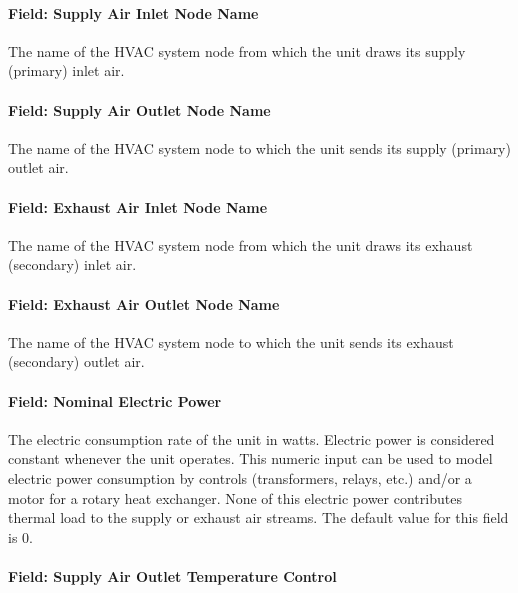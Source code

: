 \paragraph{Field: Supply Air Inlet Node Name}\label{field-supply-air-inlet-node-name-1-000}

The name of the HVAC system node from which the unit draws its supply (primary) inlet air.

\paragraph{Field: Supply Air Outlet Node Name}\label{field-supply-air-outlet-node-name-1}

The name of the HVAC system node to which the unit sends its supply (primary) outlet air.

\paragraph{Field: Exhaust Air Inlet Node Name}\label{field-exhaust-air-inlet-node-name}

The name of the HVAC system node from which the unit draws its exhaust (secondary) inlet air.

\paragraph{Field: Exhaust Air Outlet Node Name}\label{field-exhaust-air-outlet-node-name}

The name of the HVAC system node to which the unit sends its exhaust (secondary) outlet air.

\paragraph{Field: Nominal Electric Power}\label{field-nominal-electric-power-1}

The electric consumption rate of the unit in watts. Electric power is considered constant whenever the unit operates. This numeric input can be used to model electric power consumption by controls (transformers, relays, etc.) and/or a motor for a rotary heat exchanger. None of this electric power contributes thermal load to the supply or exhaust air streams. The default value for this field is 0.

\paragraph{Field: Supply Air Outlet Temperature Control}\label{field-supply-air-outlet-temperature-control}

